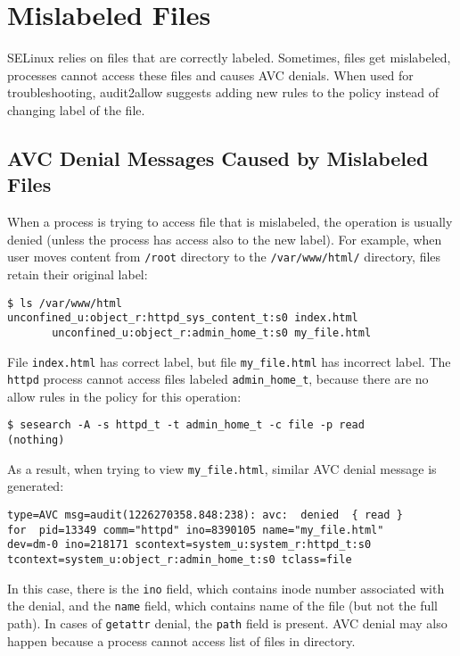 \section{Mislabeled Files}
SELinux relies on files that are correctly labeled. Sometimes, files get
mislabeled, processes cannot access these files and causes AVC denials. When
used for troubleshooting, audit2allow suggests adding new rules to the policy
instead of changing label of the file.

\subsection{AVC Denial Messages Caused by Mislabeled Files}
When a process is trying to access file that is mislabeled, the operation is
usually denied (unless the process has access also to the new label). For
example, when user moves content from \texttt{/root} directory to the
\texttt{/var/www/html/} directory, files retain their original label:
\begin{lstlisting}
$ ls /var/www/html
unconfined_u:object_r:httpd_sys_content_t:s0 index.html
       unconfined_u:object_r:admin_home_t:s0 my_file.html
\end{lstlisting}
File \texttt{index.html} has correct label, but file \texttt{my\_file.html} has
incorrect label. The \texttt{httpd} process cannot access files labeled
\texttt{admin\_home\_t}, because there are no allow rules in the policy for this
operation:
\begin{lstlisting}
$ sesearch -A -s httpd_t -t admin_home_t -c file -p read
(nothing)
\end{lstlisting}

As a result, when trying to view \texttt{my\_file.html}, similar AVC denial
message is generated:
\begin{lstlisting}
type=AVC msg=audit(1226270358.848:238): avc:  denied  { read }
for  pid=13349 comm="httpd" ino=8390105 name="my_file.html"
dev=dm-0 ino=218171 scontext=system_u:system_r:httpd_t:s0
tcontext=system_u:object_r:admin_home_t:s0 tclass=file
\end{lstlisting}
In this case, there is the \texttt{ino} field, which contains inode number
associated with the denial, and the \texttt{name} field, which contains name of
the file (but not the full path). In cases of \texttt{getattr} denial, the
\texttt{path} field is present. AVC denial may also happen because a process
cannot access list of files in directory.

